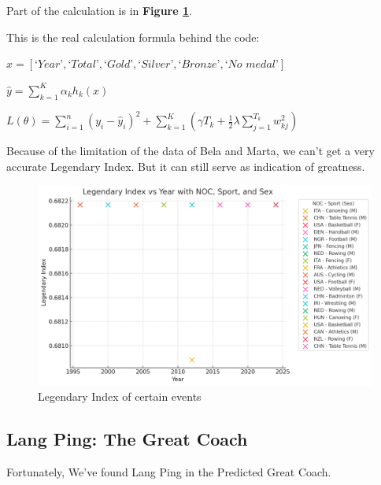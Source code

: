 Part of the calculation is in \textbf{Figure \ref{fig:legendary_index_detailed}}.

This is the real calculation formula behind the code:
\begin{center}
$ x = [\textit{`Year'}, \textit{`Total'}, \textit{`Gold'}, \textit{`Silver'}, \textit{`Bronze'}, \textit{`No medal'}]$

$\hat{y} = \sum_{k=1}^{K} \alpha_k h_k(x)$

$L(\theta) = \sum_{i=1}^{n} \left( y_i - \hat{y}_i \right)^2 + \sum_{k=1}^{K} \left( \gamma T_k + \frac{1}{2} \lambda \sum_{j=1}^{T_k} w_{kj}^2 \right)$

\end{center}

Because of the limitation of the data of Bela and Marta, we can't get a very accurate Legendary Index. But it can still serve as indication of greatness.

\begin{figure}[h]
\centering
    \includegraphics[width=1\textwidth]{./figures/Lengendary_index_detailed.png}
    \caption{Legendary Index of certain events}
    \label{fig:legendary_index_detailed}
\end{figure}

\subsection{Lang Ping: The Great Coach}

Fortunately, We've found Lang Ping in the Predicted Great Coach.

